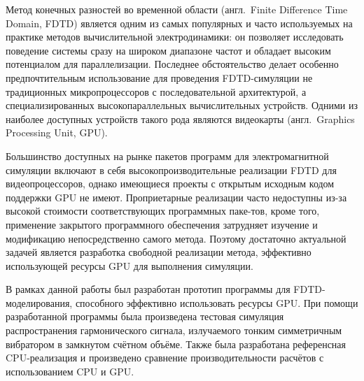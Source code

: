 
Метод конечных разностей во временной области (англ.~Finite Difference Time Domain, FDTD) является одним из самых популярных и часто используемых на практике методов вычислительной электродинамики: он позволяет исследовать поведение системы сразу на широком диапазоне частот и обладает высоким потенциалом для параллелизации. Последнее обстоятельство делает особенно предпочтительным использование для проведения FDTD-симуляции не традиционных микропроцессоров с последовательной архитектурой, а специализированных высокопараллельных вычислительных устройств. Одними из наиболее доступных устройств такого рода являются видеокарты (англ.~Graphics Processing Unit, GPU).

Большинство доступных на рынке пакетов программ для электромагнитной симуляции включают в себя высокопроизводительные реализации FDTD для видеопроцессоров, однако имеющиеся проекты с открытым исходным кодом поддержки GPU не имеют. Проприетарные реализации часто недоступны из-за высокой стоимости соответствующих программных паке-тов, кроме того, применение закрытого программного обеспечения затрудняет изучение и модификацию непосредственно самого метода. Поэтому достаточно актуальной задачей является разработка свободной реализации метода, эффективно использующей ресурсы GPU для выполнения симуляции.

В рамках данной работы был разработан прототип программы для FDTD-моделирования, способного эффективно использовать ресурсы GPU. При помощи разработанной программы была произведена тестовая симуляция распространения гармонического сигнала, излучаемого тонким симметричным вибратором в замкнутом счётном объёме. Также была разработана референсная CPU-реализация и произведено сравнение производительности расчётов с использованием CPU и GPU.

\clearpage